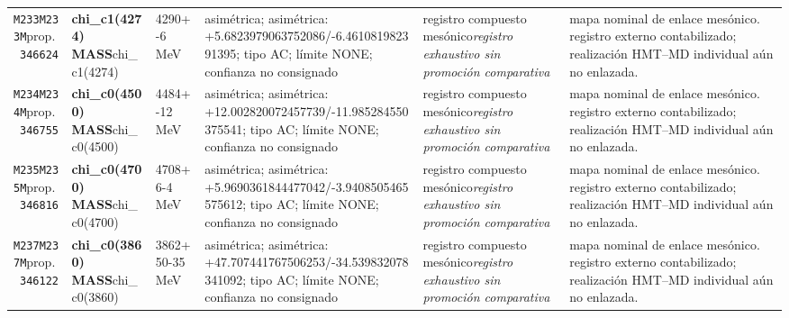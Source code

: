 \begin{landscape}
\begin{longtable}{L{1.85cm}L{4.45cm}L{2.35cm}L{4.05cm}L{3.35cm}L{7.15cm}}
\texttt{M233}\newline \texttt{M233M}\newline prop.\ \texttt{346624} & \textbf{chi\_\allowbreak{}c1(4274) MASS}\newline chi\_\allowbreak{}c1(4274) & 4290+-6\,MeV & asimétrica; asimétrica: +5.6823979063752086/-6.461081982391395; tipo AC; límite NONE; confianza no consignado & registro compuesto mesónico\newline \emph{registro exhaustivo sin promoción comparativa} & mapa nominal de enlace mesónico. registro externo contabilizado; realización HMT--MD individual aún no enlazada. \\
\texttt{M234}\newline \texttt{M234M}\newline prop.\ \texttt{346755} & \textbf{chi\_\allowbreak{}c0(4500) MASS}\newline chi\_\allowbreak{}c0(4500) & 4484+-12\,MeV & asimétrica; asimétrica: +12.002820072457739/-11.985284550375541; tipo AC; límite NONE; confianza no consignado & registro compuesto mesónico\newline \emph{registro exhaustivo sin promoción comparativa} & mapa nominal de enlace mesónico. registro externo contabilizado; realización HMT--MD individual aún no enlazada. \\
\texttt{M235}\newline \texttt{M235M}\newline prop.\ \texttt{346816} & \textbf{chi\_\allowbreak{}c0(4700) MASS}\newline chi\_\allowbreak{}c0(4700) & 4708+6-4\,MeV & asimétrica; asimétrica: +5.9690361844477042/-3.9408505465575612; tipo AC; límite NONE; confianza no consignado & registro compuesto mesónico\newline \emph{registro exhaustivo sin promoción comparativa} & mapa nominal de enlace mesónico. registro externo contabilizado; realización HMT--MD individual aún no enlazada. \\
\texttt{M237}\newline \texttt{M237M}\newline prop.\ \texttt{346122} & \textbf{chi\_\allowbreak{}c0(3860) MASS}\newline chi\_\allowbreak{}c0(3860) & 3862+50-35\,MeV & asimétrica; asimétrica: +47.707441767506253/-34.539832078341092; tipo AC; límite NONE; confianza no consignado & registro compuesto mesónico\newline \emph{registro exhaustivo sin promoción comparativa} & mapa nominal de enlace mesónico. registro externo contabilizado; realización HMT--MD individual aún no enlazada. \\

\end{longtable}
\end{landscape}
